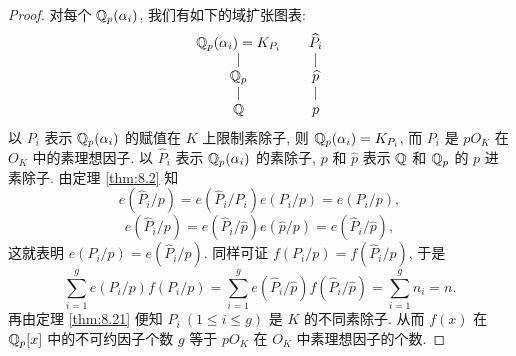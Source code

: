\begin{proof}
对每个 $\mathbb{Q}_p(\alpha_i)$, 我们有如下的域扩张图表:
\[
  \begin{array}{ccc}
    \mathbb{Q}_p(\alpha_i)=K_{P_i} & & \widehat{P}_i\\
    \mid & & \mid\\
    \mathbb{Q}_p & & \widehat{p}\\
    \mid & & \mid\\
    \mathbb{Q} & & p
  \end{array}
\]
以 $P_i$ 表示 $\mathbb{Q}_p(\alpha_i)$ 的赋值在 $K$ 上限制素除子, 则 $\mathbb{Q}_p(\alpha_i)=K_{P_i}$, 而 $P_i$ 是 $pO_K$ 在 $O_K$ 中的素理想因子. 以 $\widehat{P}_i$ 表示 $\mathbb{Q}_p(\alpha_i)$ 的素除子, $p$ 和 $\widehat{p}$ 表示 $\mathbb{Q}$ 和 $\mathbb{Q}_p$ 的 $p$ 进素除子. 由定理 \ref{thm:8.2} 知
\[
  e(\widehat{P}_i/p)=e(\widehat{P}_i/P_i)e(P_i/p)=e(P_i/p),
\]
\[
  e(\widehat{P}_i/p)=e(\widehat{P}_i/\widehat{p})e(\widehat{p}/p)=e(\widehat{P}_i/\widehat{p}),
\]
这就表明 $e(P_i/p)=e(\widehat{P}_i/\widehat{p})$. 同样可证 $f(P_i/p)=f(\widehat{P}_i/\widehat{p})$, 于是
\[
  \sum_{i=1}^{g}e(P_i/p)f(P_i/p)
  =\sum_{i=1}^{g}e(\widehat{P}_i/\widehat{p})f(\widehat{P}_i/\widehat{p})
  =\sum_{i=1}^{g}n_i=n.
\]
再由定理 \ref{thm:8.21} 便知 $P_i\ (1\leqslant i\leqslant g)$ 是 $K$ 的不同素除子. 从而 $f(x)$ 在 $\mathbb{Q}_p[x]$ 中的不可约因子个数 $g$ 等于 $pO_K$ 在 $O_K$ 中素理想因子的个数.
\end{proof}

